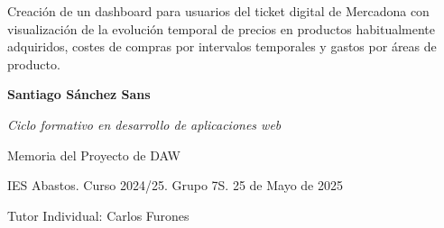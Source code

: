 \documentclass[a4paper,12pt]{report}
\begin{document}
	
	

	
	
	
	\begin{titlepage}
		\begin{center}

			
			\vspace*{5cm} 

			\LARGE{Creación de un dashboard para usuarios del ticket digital de Mercadona con visualización de la evolución temporal de precios en productos habitualmente adquiridos, costes de compras por intervalos temporales y gastos por áreas de producto.}
			
			\vfill
			
		\begin{flushright}
			\large{\textbf{Santiago Sánchez Sans}}
			
			\large{\textit{Ciclo formativo en desarrollo de aplicaciones web}}
			
			\large{Memoria del Proyecto de DAW}
			
			\large{IES Abastos. Curso 2024/25. Grupo 7S. 25 de Mayo de 2025}
			
			\large{Tutor Individual: Carlos Furones}
		\end{flushright}

			
			
			
			
		\end{center}
	\end{titlepage}
	
	
	
	
	
	
	
	
	
\end{document}

